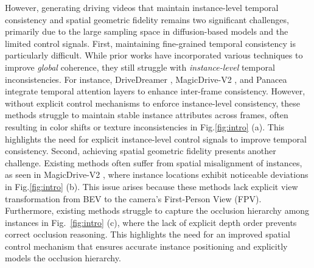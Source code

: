 However, generating driving videos that maintain instance-level temporal consistency and spatial geometric fidelity remains two significant challenges, primarily due to the large sampling space in diffusion-based models and the limited control signals. 
First, maintaining fine-grained temporal consistency is particularly difficult. While prior works \cite{gao2023magicdrive, gao2024magicdrivedithighresolutionlongvideo, wen2024panacea, drivedreamer2, wang2023drive, li2023drivingdiffusionlayoutguidedmultiviewdriving} have incorporated various techniques to improve \textit{global} coherence, they still struggle with \textit{instance-level} temporal inconsistencies. For instance, DriveDreamer \cite{wang2023drive}, MagicDrive-V2 \cite{gao2024magicdrivedithighresolutionlongvideo}, and Panacea \cite{wen2024panacea} integrate temporal attention layers to enhance inter-frame consistency.
However, without explicit control mechanisms to enforce instance-level consistency, these methods struggle to maintain stable instance attributes across frames, often resulting in color shifts or texture inconsistencies in Fig.\ref{fig:intro} (a). This highlights the need for explicit instance-level control signals to improve temporal consistency.
Second, achieving spatial geometric fidelity presents another challenge. 
Existing methods often suffer from spatial misalignment of instances, as seen in MagicDrive-V2 \cite{gao2024magicdrivedithighresolutionlongvideo}, where instance locations exhibit noticeable deviations in Fig.\ref{fig:intro} (b). This issue arises because these methods lack explicit view transformation from BEV to the camera’s First-Person View (FPV). 
Furthermore, existing methods struggle to capture the occlusion hierarchy among instances in Fig.~\ref{fig:intro} (c), where the lack of explicit depth order prevents correct occlusion reasoning. This highlights the need for an improved spatial control mechanism that ensures accurate instance positioning and explicitly models the occlusion hierarchy.

